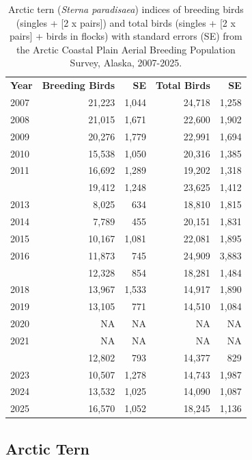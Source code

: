 \documentclass[
]{article}
\begin{document}
\begin{longtable}[t]{lrrrr}

\caption{\label{tbl-ARTE}Arctic tern (\emph{Sterna paradisaea}) indices
of breeding birds (singles + {[}2 x pairs{]}) and total birds (singles +
{[}2 x pairs{]} + birds in flocks) with standard errors (SE) from the
Arctic Coastal Plain Aerial Breeding Population Survey, Alaska,
2007-2025.}

\tabularnewline

\\
\toprule
\textbf{Year} & \textbf{Breeding Birds} & \textbf{SE} & \textbf{Total Birds} & \textbf{SE}\\
\midrule
2007 & 21,223 & 1,044 & 24,718 & 1,258\\
2008 & 21,015 & 1,671 & 22,600 & 1,902\\
2009 & 20,276 & 1,779 & 22,991 & 1,694\\
2010 & 15,538 & 1,050 & 20,316 & 1,385\\
2011 & 16,692 & 1,289 & 19,202 & 1,318\\
\addlinespace
2012 & 19,412 & 1,248 & 23,625 & 1,412\\
2013 & 8,025 & 634 & 18,810 & 1,815\\
2014 & 7,789 & 455 & 20,151 & 1,831\\
2015 & 10,167 & 1,081 & 22,081 & 1,895\\
2016 & 11,873 & 745 & 24,909 & 3,883\\
\addlinespace
2017 & 12,328 & 854 & 18,281 & 1,484\\
2018 & 13,967 & 1,533 & 14,917 & 1,890\\
2019 & 13,105 & 771 & 14,510 & 1,084\\
2020 & NA & NA & NA & NA\\
2021 & NA & NA & NA & NA\\
\addlinespace
2022 & 12,802 & 793 & 14,377 & 829\\
2023 & 10,507 & 1,278 & 14,743 & 1,987\\
2024 & 13,532 & 1,025 & 14,090 & 1,087\\
2025 & 16,570 & 1,052 & 18,245 & 1,136\\
\bottomrule

\end{longtable}

\endgroup{}

\newpage{}

\subsection*{Arctic Tern}\label{arctic-tern-2}
\end{document}
